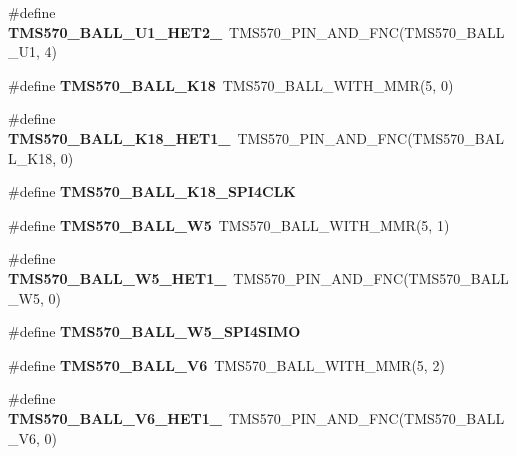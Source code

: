 \begin{DoxyCompactItemize}
\item 
\mbox{\label{tms570ls3137zwt-pins_8h_a611d835f28d8ff30debc0c450535ab3b}} 
\#define {\bfseries T\+M\+S570\+\_\+\+B\+A\+L\+L\+\_\+\+U1\+\_\+\+H\+E\+T2\+\_}~T\+M\+S570\+\_\+\+P\+I\+N\+\_\+\+A\+N\+D\+\_\+\+F\+NC(T\+M\+S570\+\_\+\+B\+A\+L\+L\+\_\+\+U1, 4)
\item 
\mbox{\label{tms570ls3137zwt-pins_8h_aa2e7349783370f9cca14b4fa5a86cea0}} 
\#define {\bfseries T\+M\+S570\+\_\+\+B\+A\+L\+L\+\_\+\+K18}~T\+M\+S570\+\_\+\+B\+A\+L\+L\+\_\+\+W\+I\+T\+H\+\_\+\+M\+MR(5, 0)
\item 
\mbox{\label{tms570ls3137zwt-pins_8h_a651459dc2edee02af45c992eeb99f777}} 
\#define {\bfseries T\+M\+S570\+\_\+\+B\+A\+L\+L\+\_\+\+K18\+\_\+\+H\+E\+T1\+\_}~T\+M\+S570\+\_\+\+P\+I\+N\+\_\+\+A\+N\+D\+\_\+\+F\+NC(T\+M\+S570\+\_\+\+B\+A\+L\+L\+\_\+\+K18, 0)
\item 
\#define {\bfseries T\+M\+S570\+\_\+\+B\+A\+L\+L\+\_\+\+K18\+\_\+\+S\+P\+I4\+C\+LK}
\item 
\mbox{\label{tms570ls3137zwt-pins_8h_aaf203ddc88659966742adc6a0f495341}} 
\#define {\bfseries T\+M\+S570\+\_\+\+B\+A\+L\+L\+\_\+\+W5}~T\+M\+S570\+\_\+\+B\+A\+L\+L\+\_\+\+W\+I\+T\+H\+\_\+\+M\+MR(5, 1)
\item 
\mbox{\label{tms570ls3137zwt-pins_8h_a823d0aceeac4eedad2cca3524102e25b}} 
\#define {\bfseries T\+M\+S570\+\_\+\+B\+A\+L\+L\+\_\+\+W5\+\_\+\+H\+E\+T1\+\_}~T\+M\+S570\+\_\+\+P\+I\+N\+\_\+\+A\+N\+D\+\_\+\+F\+NC(T\+M\+S570\+\_\+\+B\+A\+L\+L\+\_\+\+W5, 0)
\item 
\#define {\bfseries T\+M\+S570\+\_\+\+B\+A\+L\+L\+\_\+\+W5\+\_\+\+S\+P\+I4\+S\+I\+MO}
\item 
\mbox{\label{tms570ls3137zwt-pins_8h_a096a16351849a2b4edce1ae9c88675af}} 
\#define {\bfseries T\+M\+S570\+\_\+\+B\+A\+L\+L\+\_\+\+V6}~T\+M\+S570\+\_\+\+B\+A\+L\+L\+\_\+\+W\+I\+T\+H\+\_\+\+M\+MR(5, 2)
\item 
\mbox{\label{tms570ls3137zwt-pins_8h_ae39ff47f1299120fe72bb9c5634907f7}} 
\#define {\bfseries T\+M\+S570\+\_\+\+B\+A\+L\+L\+\_\+\+V6\+\_\+\+H\+E\+T1\+\_}~T\+M\+S570\+\_\+\+P\+I\+N\+\_\+\+A\+N\+D\+\_\+\+F\+NC(T\+M\+S570\+\_\+\+B\+A\+L\+L\+\_\+\+V6, 0)

\end{DoxyCompactItemize}
